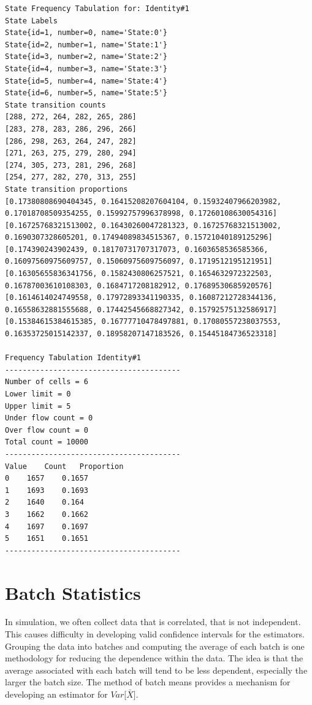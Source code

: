 \documentclass[
]{book}
\theoremstyle{definition}
\theoremstyle{definition}
\theoremstyle{definition}
\theoremstyle{definition}
\theoremstyle{remark}
\begin{document}
\begin{verbatim}
State Frequency Tabulation for: Identity#1
State Labels
State{id=1, number=0, name='State:0'}
State{id=2, number=1, name='State:1'}
State{id=3, number=2, name='State:2'}
State{id=4, number=3, name='State:3'}
State{id=5, number=4, name='State:4'}
State{id=6, number=5, name='State:5'}
State transition counts
[288, 272, 264, 282, 265, 286]
[283, 278, 283, 286, 296, 266]
[286, 298, 263, 264, 247, 282]
[271, 263, 275, 279, 280, 294]
[274, 305, 273, 281, 296, 268]
[254, 277, 282, 270, 313, 255]
State transition proportions
[0.17380808690404345, 0.16415208207604104, 0.15932407966203982, 0.17018708509354255, 0.15992757996378998, 0.17260108630054316]
[0.16725768321513002, 0.16430260047281323, 0.16725768321513002, 0.1690307328605201, 0.17494089834515367, 0.15721040189125296]
[0.174390243902439, 0.18170731707317073, 0.1603658536585366, 0.16097560975609757, 0.15060975609756097, 0.1719512195121951]
[0.16305655836341756, 0.1582430806257521, 0.1654632972322503, 0.16787003610108303, 0.1684717208182912, 0.17689530685920576]
[0.1614614024749558, 0.17972893341190335, 0.16087212728344136, 0.16558632881555688, 0.17442545668827342, 0.15792575132586917]
[0.15384615384615385, 0.16777710478497881, 0.17080557238037553, 0.16353725015142337, 0.18958207147183526, 0.15445184736523318]

Frequency Tabulation Identity#1
----------------------------------------
Number of cells = 6
Lower limit = 0
Upper limit = 5
Under flow count = 0
Over flow count = 0
Total count = 10000
----------------------------------------
Value    Count   Proportion
0    1657    0.1657
1    1693    0.1693
2    1640    0.164
3    1662    0.1662
4    1697    0.1697
5    1651    0.1651
----------------------------------------
\end{verbatim}

\hypertarget{batch-statistics}{%
\section{Batch Statistics}\label{batch-statistics}}

In simulation, we often collect data that is correlated, that is not independent. This causes difficulty in developing valid confidence intervals for the estimators. Grouping the data into batches and computing the average of each batch is one methodology for reducing the dependence within the data. The idea is that the average associated with each batch will tend to be less dependent, especially the larger the batch size. The method of batch means provides a mechanism for developing an estimator for \(Var\lbrack \bar{X} \rbrack\).
\end{document}

